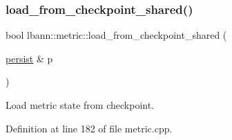 \subsubsection{\texorpdfstring{load\+\_\+from\+\_\+checkpoint\+\_\+shared()}{load\_from\_checkpoint\_shared()}}
{\footnotesize\ttfamily bool lbann\+::metric\+::load\+\_\+from\+\_\+checkpoint\+\_\+shared (\begin{DoxyParamCaption}\item[{\hyperlink{classlbann_1_1persist}{persist} \&}]{p }\end{DoxyParamCaption})\hspace{0.3cm}{\ttfamily [virtual]}}

Load metric state from checkpoint. 

Definition at line 182 of file metric.\+cpp.


